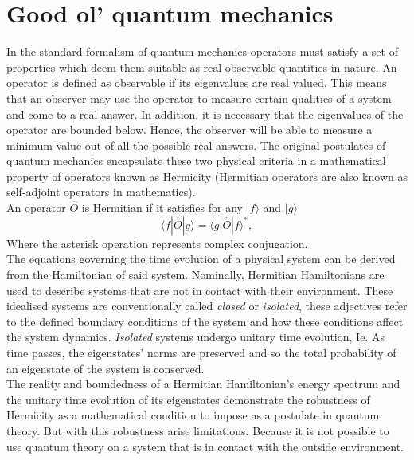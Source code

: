 \documentclass[10pt, a4paper, singlespacing, headsepline]{report}
\begin{document}
\section{Good ol' quantum mechanics}\label{QM}
In the standard formalism of quantum mechanics operators must satisfy a set of properties which deem them suitable as real observable quantities in nature.
An operator is defined as observable if its eigenvalues are real valued. This means that an observer may use the operator to measure certain qualities of a system and come to a real answer. In addition, it is  necessary that the eigenvalues of the operator are bounded below. Hence, the observer will be able to measure a minimum value out of all the possible real answers. 
The original postulates of quantum mechanics encapsulate these two physical criteria in a mathematical property of operators known as Hermicity (Hermitian operators are also known as self-adjoint operators in mathematics).\\
An operator $\hat{O}$ is Hermitian if it satisfies for any $|f \rangle$ and $|g\rangle$
\begin{equation} \label{eq:1}
\langle f|\widehat{O}|g\rangle = \langle g|\widehat{O}|f \rangle^{*},
\end{equation}  
Where the asterisk operation represents complex conjugation.\\
The equations governing the time evolution of a physical system can be derived from the Hamiltonian of said system\cite{BenderPT}. Nominally, Hermitian Hamiltonians are used to describe systems that are not in contact with their environment. These idealised systems are conventionally called \emph{closed} or \emph{isolated}, these adjectives refer to the defined boundary conditions of the system and how these conditions affect the system dynamics. \emph{Isolated} systems undergo unitary time evolution, Ie. As time passes, the eigenstates' norms are preserved and so the total probability of an eigenstate of the system is conserved. 
\\The reality and boundedness of a Hermitian Hamiltonian's energy spectrum and the unitary time evolution of its eigenstates demonstrate the robustness of Hermicity as a mathematical condition to impose as a postulate in quantum theory.
But with this robustness arise limitations. Because it is not possible to use quantum theory on a system that is in contact with the outside environment.
\end{document}
